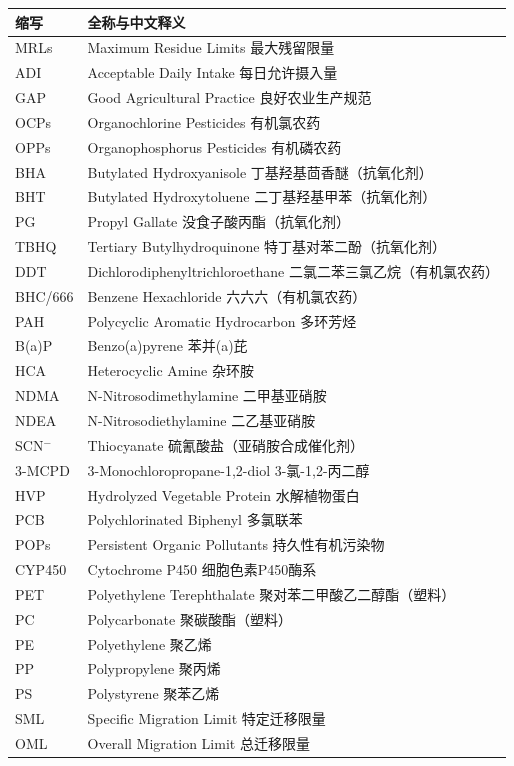 \begin{table}[H]
\centering
\begin{tabularx}{\textwidth}{lX}
\toprule
\textbf{缩写} & \textbf{全称与中文释义} \\
\midrule
MRLs & Maximum Residue Limits \hfill 最大残留限量 \\
ADI & Acceptable Daily Intake \hfill 每日允许摄入量 \\
GAP & Good Agricultural Practice \hfill 良好农业生产规范 \\
OCPs & Organochlorine Pesticides \hfill 有机氯农药 \\
OPPs & Organophosphorus Pesticides \hfill 有机磷农药 \\
BHA & Butylated Hydroxyanisole \hfill 丁基羟基茴香醚（抗氧化剂） \\
BHT & Butylated Hydroxytoluene \hfill 二丁基羟基甲苯（抗氧化剂） \\
PG & Propyl Gallate \hfill 没食子酸丙酯（抗氧化剂） \\
TBHQ & Tertiary Butylhydroquinone \hfill 特丁基对苯二酚（抗氧化剂） \\
DDT & Dichlorodiphenyltrichloroethane \hfill 二氯二苯三氯乙烷（有机氯农药） \\
BHC/666 & Benzene Hexachloride \hfill 六六六（有机氯农药） \\
PAH & Polycyclic Aromatic Hydrocarbon \hfill 多环芳烃 \\
B(a)P & Benzo(a)pyrene \hfill 苯并(a)芘 \\
HCA & Heterocyclic Amine \hfill 杂环胺 \\
NDMA & N-Nitrosodimethylamine \hfill 二甲基亚硝胺 \\
NDEA & N-Nitrosodiethylamine \hfill 二乙基亚硝胺 \\
SCN$^-$ & Thiocyanate \hfill 硫氰酸盐（亚硝胺合成催化剂） \\
3-MCPD & 3-Monochloropropane-1,2-diol \hfill 3-氯-1,2-丙二醇 \\
HVP & Hydrolyzed Vegetable Protein \hfill 水解植物蛋白 \\
PCB & Polychlorinated Biphenyl \hfill 多氯联苯 \\
POPs & Persistent Organic Pollutants \hfill 持久性有机污染物 \\
CYP450 & Cytochrome P450 \hfill 细胞色素P450酶系 \\
PET & Polyethylene Terephthalate \hfill 聚对苯二甲酸乙二醇酯（塑料） \\
PC & Polycarbonate \hfill 聚碳酸酯（塑料） \\
PE & Polyethylene \hfill 聚乙烯 \\
PP & Polypropylene \hfill 聚丙烯 \\
PS & Polystyrene \hfill 聚苯乙烯 \\
SML & Specific Migration Limit \hfill 特定迁移限量 \\
OML & Overall Migration Limit \hfill 总迁移限量 \\
\bottomrule
\end{tabularx}
\end{table}

